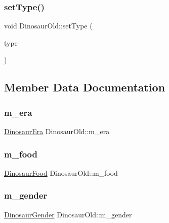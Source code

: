 \subsubsection{\texorpdfstring{set\+Type()}{setType()}}
{\footnotesize\ttfamily void Dinosaur\+Old\+::set\+Type (\begin{DoxyParamCaption}\item[{const \hyperlink{DinosaurOld_8hpp_a9f8d7b1c3f7b7d03f4101875fa35e8ea}{Dinosaur\+Type}}]{type }\end{DoxyParamCaption})}



\subsection{Member Data Documentation}
\mbox{\label{classDinosaurOld_a1a2e4588ddc0649ed70ea7b78b56a68e}} 
\subsubsection{\texorpdfstring{m\+\_\+era}{m\_era}}
{\footnotesize\ttfamily \hyperlink{DinosaurOld_8hpp_aa47f0b0878c65fb93dcaf8fde26dfaa5}{Dinosaur\+Era} Dinosaur\+Old\+::m\+\_\+era\hspace{0.3cm}{\ttfamily [private]}}

\mbox{\label{classDinosaurOld_ab89b3aa127ad4eac75acac6fc54c0a48}} 
\subsubsection{\texorpdfstring{m\+\_\+food}{m\_food}}
{\footnotesize\ttfamily \hyperlink{DinosaurOld_8hpp_aeeb0837497c35a4ebbceb4e9386909f8}{Dinosaur\+Food} Dinosaur\+Old\+::m\+\_\+food\hspace{0.3cm}{\ttfamily [private]}}

\mbox{\label{classDinosaurOld_a1c600f7953a6f464da2600f7d7a0d24a}} 
\subsubsection{\texorpdfstring{m\+\_\+gender}{m\_gender}}
{\footnotesize\ttfamily \hyperlink{DinosaurOld_8hpp_a98f70ab69c44631b0efc003a2c9b3d30}{Dinosaur\+Gender} Dinosaur\+Old\+::m\+\_\+gender\hspace{0.3cm}{\ttfamily [private]}}

